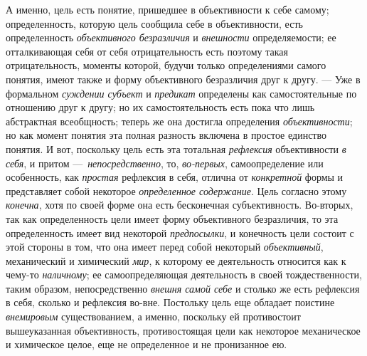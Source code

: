 \documentclass[twoside]{article}
\begin{document}
{{{{А именно, цель есть понятие, пришедшее в объективности к себе
самому; определенность, которую цель сообщила себе в объективности, есть
определенность {\em объективного
безразличия} и
{\em внешности}
определяемости; ее отталкивающая себя от себя отрицательность
есть поэтому такая отрицательность, моменты которой, будучи только
определениями самого понятия, имеют также и форму объективного безразличия
друг к другу. — Уже в формальном
{\em суждении субъект} и
{\em предикат} определены
как самостоятельные по отношению друг к другу; но их самостоятельность есть
пока что лишь абстрактная всеобщность; теперь же она достигла определения
{\em объективности}; но
как момент понятия эта полная разность включена в простое единство понятия.
И вот, поскольку цель есть эта тотальная
{\em рефлексия}
объективности {\em в
себя}, и притом
—~{\em непосредственно},
то, {\em во-первых},
самоопределение или особенность, как
{\em простая} рефлексия в
себя, отлична от {\em конкретной}
формы и представляет собой некоторое
{\em определенное содержание}.
Цель согласно этому
{\em конечна}, хотя по
своей форме она есть бесконечная субъективность. Во-вторых, так как
определенность цели имеет форму объективного безразличия, то эта
определенность имеет вид некоторой
{\em предпосылки}, и
конечность цели состоит с этой стороны в том, что она имеет перед собой
некоторый {\em объективный},
механический и химический
{\em мир}, к которому ее
деятельность относится как к чему-то
{\em наличному}; ее
самоопределяющая деятельность в своей тождественности, таким образом,
непосредственно {\em внешня самой себе}
и столько же есть рефлексия в себя, сколько и рефлексия
во-вне. Постольку цель еще обладает поистине
{\em внемировым}
существованием, а именно, поскольку ей противостоит
вышеуказанная объективность, противостоящая цели как
некоторое механическое и химическое целое, еще не определенное и не
пронизанное ею.

}}}}
\end{document}
